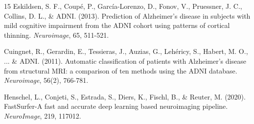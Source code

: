\documentclass[11pt, a4paper]{article}
\begin{document}
\begin{thebibliography}{15}
Eskildsen, S. F., Coupé, P., García-Lorenzo, D., Fonov, V., Pruessner, J. C., Collins, D. L., \& ADNI. (2013). Prediction of Alzheimer's disease in subjects with mild cognitive impairment from the ADNI cohort using patterns of cortical thinning. \textit{Neuroimage}, 65, 511-521.

Cuingnet, R., Gerardin, E., Tessieras, J., Auzias, G., Lehéricy, S., Habert, M. O., ... \& ADNI. (2011). Automatic classification of patients with Alzheimer's disease from structural MRI: a comparison of ten methods using the ADNI database. \textit{Neuroimage}, 56(2), 766-781.

Henschel, L., Conjeti, S., Estrada, S., Diers, K., Fischl, B., \& Reuter, M. (2020). FastSurfer-A fast and accurate deep learning based neuroimaging pipeline. \textit{NeuroImage}, 219, 117012.

\end{thebibliography}
\end{document}
